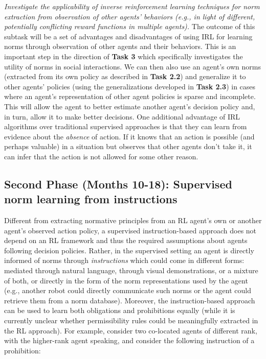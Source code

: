 \documentclass[12pt]{article}
\begin{document}
\vskip 0.05in
 {\em Investigate the applicability of
inverse reinforcement learning techniques for norm extraction from
observation of other agents' behaviors (e.g., in light of different,
potentially conflicting reward functions in multiple agents). } 
\vskip 0.05in
\noindent The outcome of this subtask will be a set of advantages and
disadvantages of using IRL for learning norms through observation of
other agents and their behaviors.  This is an important step in the
direction of {\bf Task 3} which specifically investigates the utility
of norms in social interactions.  We can then also use an agent's own
norms (extracted from its own policy as described in {\bf Task 2.2})
and generalize it to other agents' policies (using the generalizations
developed in {\bf Task 2.3}) in cases where an agent's representation
of other agent policies is sparse and incomplete.  This will allow the
agent to better estimate another agent's decision policy and, in
turn, allow it to make better decisions. One additional advantage of IRL algorithms over traditional supervised approaches is that they can learn from evidence about the {\em absence} of action. If it knows that an action is possible (and perhaps valuable) in a situation but observes that other agents don't take it, it can infer that the action is not allowed for some other reason.


\subsection*{Second Phase (Months 10-18): Supervised norm learning
  from instructions}

Different from extracting normative principles from an RL agent's own
or another agent's observed action policy, a supervised
instruction-based approach does not depend on an RL framework and thus
the required assumptions about agents following decision policies.
Rather, in the supervised setting an agent is directly informed of
norms through {\em instructions} which could come in different forms:
mediated through natural language, through visual demonstrations, or a
mixture of both, or directly in the form of the norm representations
used by the agent (e.g., another robot could directly communicate such
norms or the agent could retrieve them from a norm database).
Moreover, the instruction-based approach can be used to learn both
obligations and prohibitions equally (while it is currently unclear
whether permissibility rules could be meaningfully extracted in the RL
approach).  For example, consider two co-located agents of
different rank, with the higher-rank agent speaking, and consider the following
instruction of a prohibition: 
\vspace{-1mm}
\end{document}
